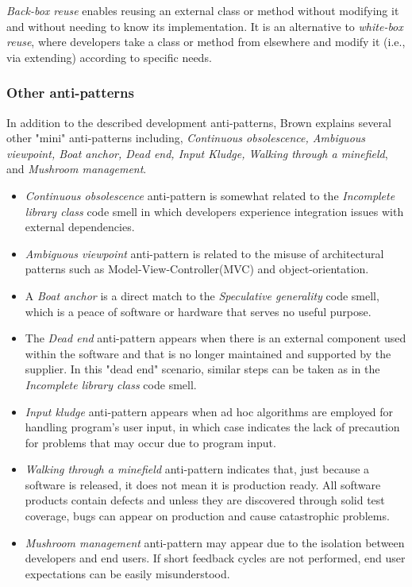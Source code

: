 \textit{Back-box reuse} enables reusing an external class or method without modifying it and without needing to know its implementation. It is an alternative to \textit{white-box reuse}, where developers take a class or method from elsewhere and modify it (i.e., via extending) according to specific needs. 

\subsubsection*{Other anti-patterns}
In addition to the described development anti-patterns, Brown \cite{brownAntiPatterns} explains several other "mini" anti-patterns including, \textit{Continuous obsolescence, Ambiguous viewpoint, Boat anchor, Dead end, Input Kludge, Walking through a minefield}, and \textit{Mushroom management}.
\begin{itemize}
\item \textit{Continuous obsolescence} anti-pattern is somewhat related to the \textit{Incomplete library class} code smell in which developers experience integration issues with external dependencies. 
\item \textit{Ambiguous viewpoint} anti-pattern is related to the misuse of architectural patterns such as Model-View-Controller(MVC) and object-orientation. 
\item A \textit{Boat anchor} is a direct match to the \textit{Speculative generality} code smell, which is a peace of software or hardware that serves no useful purpose. 
\item The \textit{Dead end} anti-pattern appears when there is an external component used within the software and that is no longer maintained and supported by the supplier. In this "dead end" scenario, similar steps can be taken as in the \textit{Incomplete library class} code smell. 
\item \textit{Input kludge} anti-pattern appears when ad hoc algorithms are employed for handling program's user input, in which case indicates the lack of precaution for problems that may occur due to program input. 
\item \textit{Walking through a minefield} anti-pattern indicates that, just because a software is released, it does not mean it is production ready. All software products contain defects and unless they are discovered through solid test coverage, bugs can appear on production and cause catastrophic problems. 
\item \textit{Mushroom management} anti-pattern may appear due to the isolation between developers and end users. If short feedback cycles are not performed, end user expectations can be easily misunderstood. 
\end{itemize}

